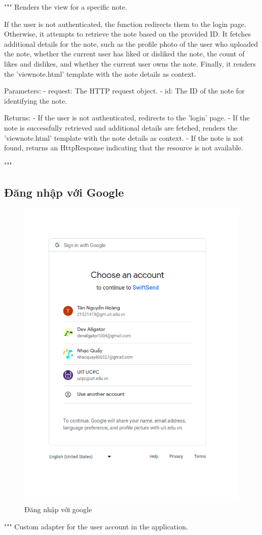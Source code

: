 \documentclass[paper=a4wide, fontsize=12pt]{scrartcl}	 %
\begin{document}
"""
Renders the view for a specific note.

If the user is not authenticated, the function redirects them to the login page.
Otherwise, it attempts to retrieve the note based on the provided ID.
It fetches additional details for the note, such as the profile photo of the user who uploaded the note,
whether the current user has liked or disliked the note, the count of likes and dislikes,
and whether the current user owns the note.
Finally, it renders the 'viewnote.html' template with the note details as context.

Parameters:
- request: The HTTP request object.
- id: The ID of the note for identifying the note.

Returns:
- If the user is not authenticated, redirects to the 'login' page.
- If the note is successfully retrieved and additional details are fetched, renders the 'viewnote.html' template with the note details as context.
- If the note is not found, returns an HttpResponse indicating that the resource is not available.

"""

\subsection{Đăng nhập với Google}
\begin{figure}[H]
    \centering
    \includegraphics[scale=0.5]{demo/google.png}
    \caption{Đăng nhập với google}
\end{figure}
"""
    Custom adapter for the user account in the application.
\end{document}
